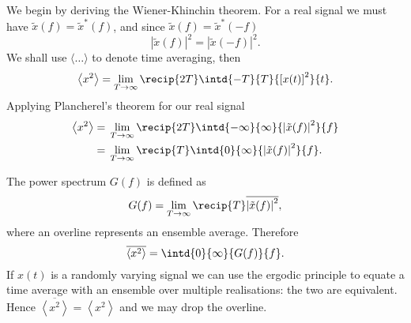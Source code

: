 We begin by deriving the Wiener-Khinchin theorem. For a real signal we must have $\tilde{x}(f) = \tilde{x}^\ast(f)$, and since $\tilde{x}(f) = \tilde{x}^\ast(-f)$
\begin{equation}
\left|\tilde{x}(f)\right|^2 = \left|\tilde{x}(-f)\right|^2.
\end{equation}
We shall use $\langle\ldots\rangle$ to denote time averaging, then
\begin{equation}
\left\langle x^2\right\rangle = \lim_{T \rightarrow \infty} \recip{2T} \intd{-T}{T}{\left[x(t)\right]^2}{t}.
\end{equation}
Applying Plancherel's theorem for our real signal
\begin{align}
\left\langle x^2\right\rangle = {} & \lim_{T \rightarrow \infty} \recip{2T} \intd{-\infty}{\infty}{\left|\tilde{x}(f)\right|^2}{f} \nonumber \\
 = {} & \lim_{T \rightarrow \infty} \recip{T} \intd{0}{\infty}{\left|\tilde{x}(f)\right|^2}{f}.
\end{align}

The power spectrum $G(f)$ is defined as
\begin{equation}
G(f) = \lim_{T \rightarrow \infty} \recip{T} \overline{\left|\tilde{x}(f)\right|^2},
\end{equation}
where an overline represents an ensemble average. Therefore
\begin{equation}
\overline{\left\langle x^2\right\rangle} = \intd{0}{\infty}{G(f)}{f}.
\end{equation}
If $x(t)$ is a randomly varying signal we can use the ergodic principle to equate a time average with an ensemble over multiple realisations: the two are equivalent. Hence $\overline{\left\langle x^2\right\rangle} = \left\langle x^2\right\rangle$ and we may drop the overline.

